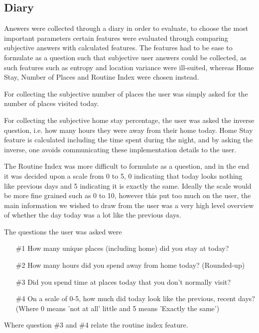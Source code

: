 \subsection{Diary}
Answers were collected through a diary in order to evaluate, to choose the most important parameters certain features were evaluated through comparing subjective answers with calculated features. The features had to be ease to formulate as a question such that subjective user answers could be collected, as such features such as entropy and location variance were ill-suited, whereas Home Stay, Number of Places and Routine Index were chosen instead. 

For collecting the subjective number of places the user was simply asked for the number of places visited today. 

For collecting the subjective home stay percentage, the user was asked the inverse question, i.e. how many hours they were away from their home today. Home Stay feature is calculated including the time spent during the night, and by asking the inverse, one avoids communicating these implementation details to the user. 

The Routine Index was more difficult to formulate as a question, and in the end it was decided upon a scale from 0 to 5, 0 indicating that today looks nothing like previous days and 5 indicating it is exactly the same. Ideally the scale would be more fine grained such as 0 to 10, however this put too much on the user, the main information we wished to draw from the user was a very high level overview of whether the day today was a lot like the previous days.

The questions the user was asked were

\begin{itemize}
    \item[\#1] How many unique places (including home) did you stay at today?
    \item[\#2] How many hours did you spend away from home today? (Rounded-up)
    \item[\#3] Did you spend time at places today that you don't normally visit?
    \item[\#4] On a scale of 0-5, how much did today look like the previous, recent days? (Where 0 means 'not at all' little and 5 means 'Exactly the same')
   
\end{itemize}

Where question \#3 and \#4 relate the routine index feature.

